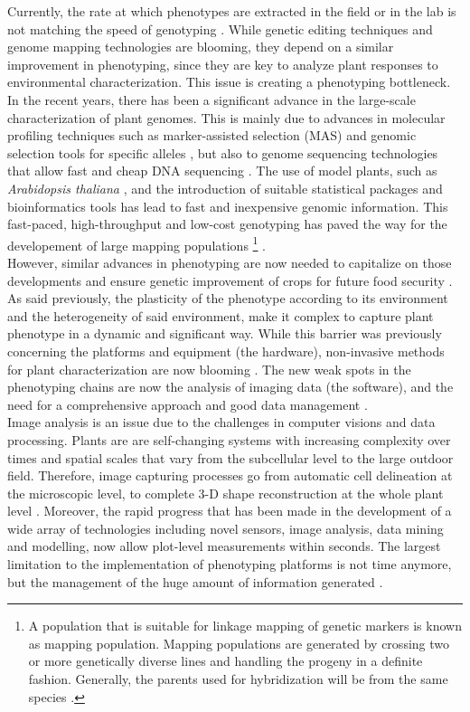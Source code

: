Currently, the rate at which phenotypes are extracted in the field or in the lab is not matching the speed of genotyping \parencite{houle_phenomics:_2010}. While genetic editing techniques and genome mapping technologies are blooming, they depend on a similar improvement in phenotyping, since they are key to analyze plant responses to environmental characterization. This issue is creating a phenotyping bottleneck.\\
In the recent years, there has been a significant advance in the large-scale characterization of plant genomes. This is mainly due to advances in molecular profiling techniques such as marker-assisted selection (MAS) and genomic selection tools for specific alleles \parencite{tester2010breeding,jannink2010genomic}, but also to genome sequencing technologies that allow fast and cheap DNA sequencing \parencite{yano2009genome}. The use of model plants, such as \textit{Arabidopsis thaliana} \parencite{atwell2010genome}, and the introduction of suitable statistical packages and bioinformatics tools has lead to fast and inexpensive genomic information. This fast-paced, high-throughput and low-cost genotyping has paved the way for the developement of large mapping populations
\footnote{A population that is suitable for linkage mapping of genetic markers is known as mapping population. Mapping populations are generated by crossing two or more genetically diverse lines and handling the progeny in a definite fashion. Generally, the parents used for hybridization will be from the same species \parencite{singh2015mapping}.} 
\parencite{mcmullen2009genetic}.\\
However, similar advances in phenotyping are now needed to capitalize on those developments and ensure genetic improvement of crops for future food security \parencite{araus_field_2014}. As said previously, the plasticity of the phenotype according to its environment and the heterogeneity of said environment, make it complex to capture plant phenotype in a dynamic and significant way. While this barrier was previously concerning the platforms and equipment (the hardware), non-invasive methods for plant characterization are now blooming \parencite{li_review_2014}. The new weak spots in the phenotyping chains are now the analysis of imaging data (the software), and the need for a comprehensive approach and good data management \parencite{fiorani_future_2013}.\\
Image analysis is an issue due to the challenges in computer visions and data processing. Plants are are self-changing systems with increasing complexity over times and spatial scales that vary from the subcellular level to the large outdoor field. Therefore, image capturing processes go from automatic cell delineation at the microscopic level, to complete 3-D shape reconstruction at the whole plant level \parencite{minervini2015image}. Moreover, the rapid progress that has been made in the development of a wide array of technologies including novel sensors, image analysis, data mining and modelling, now allow plot-level measurements within seconds. The largest limitation to the implementation of phenotyping platforms is not time anymore, but the management of the huge amount of information generated \parencite{cobb2013next,araus_field_2014}.
